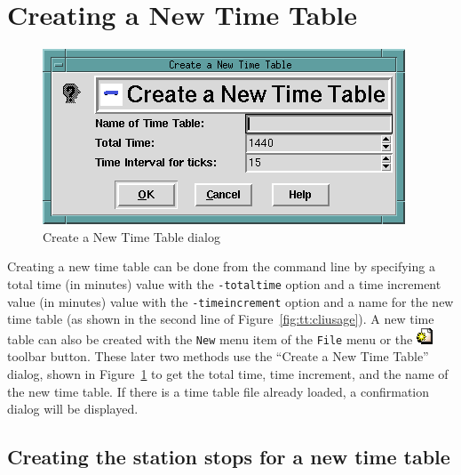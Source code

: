 \section{Creating a New Time Table}
\label{sect:tt:createnewtimetable}

\begin{figure}[hbpt]
\begin{centering}
\includegraphics{TTCreateNewTT.png}
\caption{Create a New Time Table dialog}
\label{fig:tt:GetNewTimeTableDialog}
\end{centering}
\end{figure}
Creating a new time table can be done from the command line by
specifying a total time (in minutes) value with the \texttt{-totaltime}
option and a time increment value (in minutes) value with the
\texttt{-timeincrement} option and a name for the new time table (as
shown in the second line of Figure~\ref{fig:tt:cliusage}).  A new time
table can also be created with the \texttt{New} menu item of the
\texttt{File} menu or the
\includegraphics{TTNewTool.png} toolbar button. These later two methods
use the ``Create a New Time Table'' dialog, shown in
Figure~\ref{fig:tt:GetNewTimeTableDialog} to get the total time, time
increment, and the name of the new time table.  If there is a time
table file already loaded, a confirmation dialog will be displayed.

\subsection{Creating the station stops for a new time table}
\label{sect:tt:CreateAllStationsDialog}

